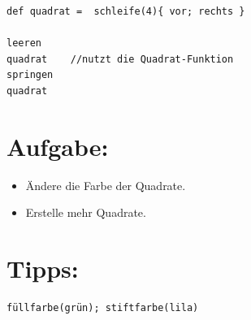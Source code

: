 \begin{lstlisting}[basicstyle={\ttfamily\fontsize{20}{24}\selectfont},numbers=none]
def quadrat =  schleife(4){ vor; rechts }  

leeren
quadrat    //nutzt die Quadrat-Funktion
springen
quadrat
\end{lstlisting}
        
\section*{\color{BrickRed}Aufgabe:}


\begin{itemize}

\item {Ändere die Farbe der Quadrate.}
\item {Erstelle mehr Quadrate.}

\end{itemize}


\section*{\color{OliveGreen}Tipps:}

\begin{lstlisting}[numbers=none]
füllfarbe(grün); stiftfarbe(lila)
\end{lstlisting}
        
